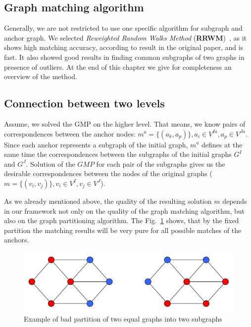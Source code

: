 \subsection{Graph matching algorithm}
Generally, we are not restricted to use one specific algorithm for subgraph and anchor graph. We selected \emph{Reweighted Random Walks Method} (\textbf{RRWM})~\cite{Cho2010_RRWM}, as it shows high matching accuracy, according to result in the original paper, and is fast. It also showed good results in finding common subgraphs of two graphs in presence of outliers. At the end of this chapter we give for completeness an overview of the method.

\subsection{Connection between two levels}
Assume, we solved the GMP on the higher level. That means, we know pairs of correspondences between the anchor nodes: $m^a = \{(a_k, a_p)\}, a_i\in V^{Ia}, a_p\in V^{Ja}$. Since each anchor represents a subgraph of the initial graph, $m^a$ defines at the same time the correspondences between the subgraphs of the initial graphs $G^I$ and $G^J$. Solution of the $GMP$ for each pair of the subgraphs gives us the desirable correspondences between the nodes of the original graphs ($m = \{(v_i, v_j)\}, v_i\in V^{I}, v_j\in V^{J}$).

As we already mentioned above, the quality of the resulting solution $m$ depends in our framework not only on the quality of the graph matching algorithm, but also on the graph partitioning algorithm. The Fig.~\ref{fig:badpartition} shows, that by the fixed partition the matching results will be very pure for all possible matches of the anchors.

\begin{figure}
	\centering
	\includegraphics[scale=0.35]{chapter2/fig/badpartition.pdf}
	\caption{Example of bad partition of two equal graphs into two subgraphs} \label{fig:badpartition}
\end{figure}


